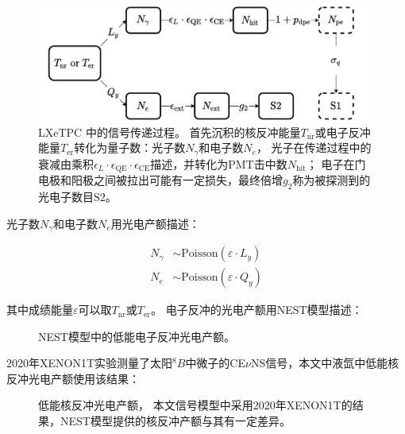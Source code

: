 \begin{figure}
    \centering
    \includegraphics[width=1.0\linewidth]{figures/signal_flow.pdf}
    \caption{\label{fig:signal_flow} LXeTPC 中的信号传递过程。
    首先沉积的核反冲能量$T_{\mathrm{nr}}$或电子反冲能量$T_{\mathrm{er}}$转化为量子数：光子数$N_\gamma$和电子数$N_e$，
    光子在传递过程中的衰减由乘积$\epsilon_L\cdot\epsilon_\mathrm{QE}\cdot\epsilon_\mathrm{CE}$描述，并转化为PMT击中数$N_\mathrm{hit}$；
    电子在门电极和阳极之间被拉出可能有一定损失，最终倍增$g_2$称为被探测到的光电子数目$\mathrm{S2}$。}
\end{figure}

光子数$N_\gamma$和电子数$N_e$用光电产额描述：

\begin{align}
    \label{eq:N_ge_lq}
    N_\gamma &\sim \mathrm{Poisson}\left(\varepsilon\cdot L_y\right) \\
    N_e &\sim \mathrm{Poisson}\left(\varepsilon\cdot Q_y\right)
\end{align}

其中成绩能量$\varepsilon$可以取$T_{\mathrm{nr}}$或$T_{\mathrm{er}}$。
电子反冲的光电产额用NEST模型描述：

\begin{figure}
    \centering
    
    \caption{\label{fig:lxe_er_yield} NEST模型中的低能电子反冲光电产额\cite{lenardo_global_2015,jason_brodsky_chris_tunnell_mszydagis_jbalajth_vetri_velan_junying_huang_2019}。}
\end{figure}

2020年XENON1T实验测量了太阳${}^{8}B$中微子的CE$\nu$NS信号\cite{aprile_search_2021}，本文中液氙中低能核反冲光电产额使用该结果：

\begin{figure}
    \centering
    
    \caption{\label{fig:lxe_nr_yield} 低能核反冲光电产额\cite{aprile_search_2021,jason_brodsky_chris_tunnell_mszydagis_jbalajth_vetri_velan_junying_huang_2019}，
    本文信号模型中采用2020年XENON1T的结果，NEST模型提供的核反冲产额与其有一定差异。}
\end{figure}

